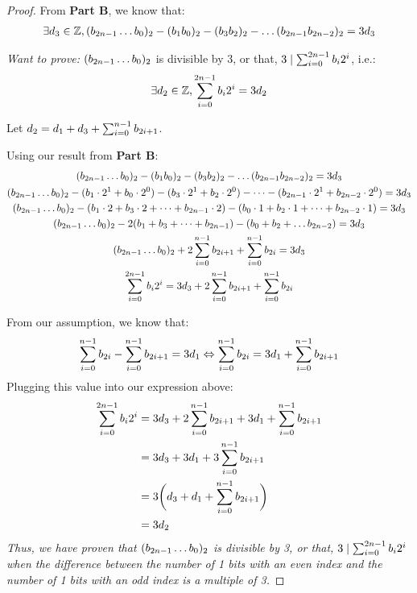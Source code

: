 \documentclass[12pt]{article}
\theoremstyle{definition}
\begin{document}
\begin{enumerate}
\begin{proof}
            From \textbf{Part B}, we know that:
            \begin{align*}
                \exists d_3 \in \mathbb Z, (b_{2n-1} \dots b_0)_2 - (b_{1} b_{0})_2 - (b_{3} b_{2})_2 - \dots (b_{2n-1} b_{2n-2})_2 = 3d_3\\
            \end{align*}
            
            \emph{Want to prove:} $(b_{2n-1} \dots b_0)_2$ is divisible by 3, or that, $3 \mathrel\mid \sum_{i=0}^{2n-1} b_i2^i$, i.e.: 
            \begin{gather*}
                \exists d_2 \in \mathbb Z, \sum_{i=0}^{2n-1}b_i2^i=3d_2
            \end{gather*}
            
            Let $d_2 = d_1 + d_3 + \sum_{i=0}^{n-1} b_{2i+1}$.
            
            \vspace{0.25cm}
            
            Using our result from \textbf{Part B}:
            \begin{gather*}
                (b_{2n-1} \dots b_0)_2 - (b_{1} b_{0})_2 - (b_{3} b_{2})_2 - \dots (b_{2n-1} b_{2n-2})_2 = 3d_3\\
                (b_{2n-1} \dots b_0)_2 - (b_1 \cdot 2^1 + b_0 \cdot 2^0) - (b_3 \cdot 2^1 + b_2 \cdot 2^0) - \dots - (b_{2n-1} \cdot 2^1 + b_{2n-2} \cdot 2^0) = 3d_3\\
                (b_{2n-1} \dots b_0)_2 - (b_1 \cdot 2 + b_3 \cdot 2 + \dots + b_{2n-1} \cdot 2) - (b_0 \cdot 1 + b_2 \cdot 1 + \dots + b_{2n-2} \cdot 1) = 3d_3\\
                (b_{2n-1} \dots b_0)_2 - 2(b_1 + b_3 + \dots + b_{2n-1}) - (b_0 + b_2 + \dots b_{2n-2}) = 3d_3\\
                (b_{2n-1} \dots b_0)_2 + 2\sum_{i=0}^{n-1} b_{2i + 1} + \sum_{i=0}^{n-1} b_{2i} = 3d_3\\
                \sum_{i=0}^{2n-1} b_i 2^i = 3d_3 + 2 \sum_{i=0}^{n-1} b_{2i+1} + \sum_{i=0}^{n-1} b_{2i}
            \end{gather*}
            
            From our assumption, we know that:
            \begin{gather*}
                \sum_{i=0}^{n-1} b_{2i} - \sum_{i=0}^{n-1} b_{2i+1} = 3d_1 \mathrel{\Leftrightarrow} \sum_{i=0}^{n-1} b_{2i} = 3d_1 + \sum_{i=0}^{n-1} b_{2i+1}
            \end{gather*}
            Plugging this value into our expression above:
            \begin{align*}
                \sum_{i=0}^{2n-1} b_i 2^i &= 3d_3 + 2 \sum_{i=0}^{n-1} b_{2i+1} + 3d_1 + \sum_{i=0}^{n-1} b_{2i+1}\\
                &= 3d_3 + 3d_1 + 3 \sum_{i=0}^{n-1} b_{2i+1}\\
                &= 3\bigg(d_3 + d_1 + \sum_{i=0}^{n-1} b_{2i+1}\bigg)\\
                &= 3d_2
            \end{align*}
            \emph{Thus, we have proven that $(b_{2n-1} \dots b_0)_2$ is divisible by 3, or that, $3 \mathrel\mid \sum_{i=0}^{2n-1} b_i2^i$ when the difference between the number of 1 bits with an even index and the number of 1 bits with an odd index is a multiple of 3.}
        \end{proof}
    
\end{enumerate}
\end{document}
